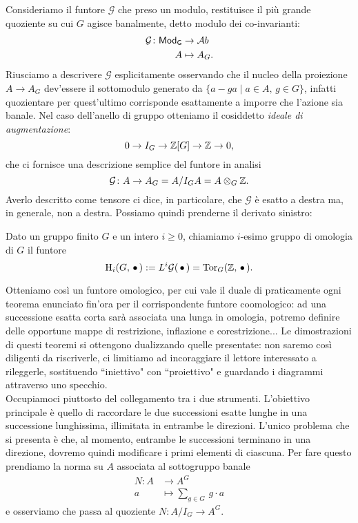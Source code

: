 Consideriamo il funtore $ \mathcal{G} $ che preso un modulo, restituisce il più grande quoziente su cui $ G $ agisce banalmente, detto modulo dei co-invarianti:
\begin{align*} 
\mathcal{G} \colon \mathsf{Mod}_\mathsf{G} &\to \mathcal{A}b \\
A &\mapsto A_G.
\end{align*}
Riusciamo a descrivere $ \mathcal{G} $ esplicitamente osservando che il nucleo della proiezione $ A \to A_G $ dev'essere il sottomodulo generato da $ \{ a - ga \mid a \in A, \, g \in G \} $, infatti quozientare per quest'ultimo corrisponde esattamente a imporre che l'azione sia banale. Nel caso dell'anello di gruppo otteniamo il cosiddetto \emph{ideale di augmentazione}:
\[ 0 \to I_G \to \mathbb{Z}[G] \to \mathbb{Z} \to 0, \]
che ci fornisce una descrizione semplice del funtore in analisi
\[ \mathcal{G} \colon A \to A_G = A/I_GA = A \otimes_G \mathbb{Z}. \]
Averlo descritto come tensore ci dice, in particolare, che $ \mathcal{G} $ è esatto a destra ma, in generale, non a destra. Possiamo quindi prenderne il derivato sinistro:

\begin{definition}
	Dato un gruppo finito $ G $ e un intero $ i \geq 0 $, chiamiamo $ i $-esimo gruppo di omologia di $ G $ il funtore
	\[ \operatorname{H}_i(G, \, \bullet \,) := L^i\mathcal{G}(\, \bullet \,) = \operatorname{Tor}_G(\mathbb{Z}, \, \bullet \, ). \]
\end{definition}

Otteniamo così un funtore omologico, per cui vale il duale di praticamente ogni teorema enunciato fin'ora per il corrispondente funtore coomologico: ad una successione esatta corta sarà associata una lunga in omologia, potremo definire delle opportune mappe di restrizione, inflazione e corestrizione... Le dimostrazioni di questi teoremi si ottengono dualizzando quelle presentate: non saremo così diligenti da riscriverle, ci limitiamo ad incoraggiare il lettore interessato a rileggerle, sostituendo \textquotedblleft iniettivo" con \textquotedblleft proiettivo" e guardando i diagrammi attraverso uno specchio.  \\

Occupiamoci piuttosto del collegamento tra i due strumenti. L'obiettivo principale è quello di raccordare le due successioni esatte lunghe in una successione lunghissima, illimitata in entrambe le direzioni. L'unico problema che si presenta è che, al momento, entrambe le successioni terminano in una direzione, dovremo quindi modificare i primi elementi di ciascuna. Per fare questo prendiamo la norma su $ A $ associata al sottogruppo banale
\begin{align*}
N \colon A  & \to A^G \\
a & \mapsto \sum_{g \in G} \, g \cdot a
\end{align*}
e osserviamo che passa al quoziente $ N \colon A/I_G \to A^G $. 

